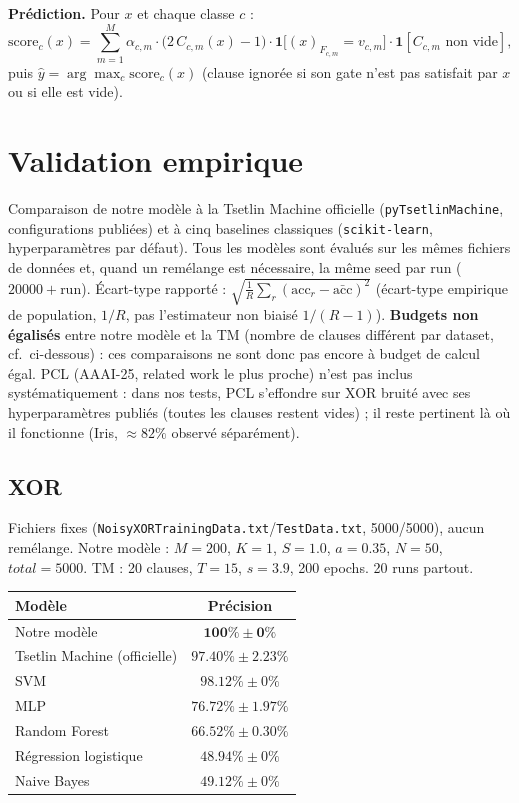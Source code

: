 \documentclass[12pt,a4paper]{article}
\begin{document}
\textbf{Prédiction.} Pour $x$ et chaque classe $c$ :
\[
  \mathrm{score}_c(x) = \sum_{m=1}^M \alpha_{c,m}\cdot\bigl(2\,C_{c,m}(x)-1\bigr)\cdot\mathbf 1\bigl[(x)_{F_{c,m}}=v_{c,m}\bigr]\cdot\mathbf 1[C_{c,m}\text{ non vide}],
\]
puis $\hat y = \arg\max_c \mathrm{score}_c(x)$ (clause ignorée si son gate n'est
pas satisfait par $x$ ou si elle est vide).



\section*{Validation empirique}

Comparaison de notre modèle à la Tsetlin Machine officielle (\texttt{pyTsetlinMachine},
configurations publiées) et à cinq baselines classiques (\texttt{scikit-learn},
hyperparamètres par défaut). Tous les modèles sont évalués sur les mêmes
fichiers de données et, quand un remélange est nécessaire, la même seed par
run ($20000+\text{run}$). Écart-type rapporté : $\sqrt{\frac1R\sum_r(\mathrm{acc}_r-\bar{\mathrm{acc}})^2}$
(écart-type empirique de population, $1/R$, pas l'estimateur non biaisé
$1/(R{-}1)$). \textbf{Budgets non égalisés} entre notre modèle et la TM
(nombre de clauses différent par dataset, cf.\ ci-dessous) : ces comparaisons
ne sont donc pas encore à budget de calcul égal. PCL (AAAI-25, related work
le plus proche) n'est pas inclus systématiquement : dans nos tests, PCL
s'effondre sur XOR bruité avec ses hyperparamètres publiés (toutes les
clauses restent vides) ; il reste pertinent là où il fonctionne (Iris,
$\approx82\%$ observé séparément).

\subsection*{XOR}
Fichiers fixes (\texttt{NoisyXORTrainingData.txt}/\texttt{TestData.txt},
5000/5000), aucun remélange. Notre modèle : $M{=}200$, $K{=}1$, $S{=}1.0$,
$a{=}0.35$, $N{=}50$, $total{=}5000$. TM : 20 clauses, $T{=}15$, $s{=}3.9$,
200 epochs. 20 runs partout.
\begin{center}
\begin{tabular}{lc}
\toprule
Modèle & Précision \\
\midrule
Notre modèle & $\mathbf{100\%\pm0\%}$ \\
Tsetlin Machine (officielle) & $97.40\%\pm2.23\%$ \\
SVM & $98.12\%\pm0\%$ \\
MLP & $76.72\%\pm1.97\%$ \\
Random Forest & $66.52\%\pm0.30\%$ \\
Régression logistique & $48.94\%\pm0\%$ \\
Naive Bayes & $49.12\%\pm0\%$ \\
\bottomrule
\end{tabular}
\end{center}
\end{document}
